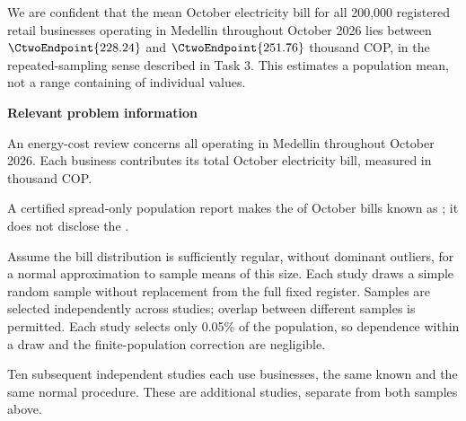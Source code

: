 We are  confident that the mean October electricity bill for all 200,000 registered retail businesses operating in Medellin throughout October 2026 lies between $\CtwoEndpoint{228.24}$ and $\CtwoEndpoint{251.76}$ thousand COP, in the repeated-sampling sense described in Task 3. This estimates a population mean, not a range containing  of individual values.

\secInicio[][sec:p1]

\clearpage



\textbf{Relevant problem information}

\begin{probleminfoexcerpt}
An energy-cost review concerns all     operating in Medellin throughout October 2026. Each business contributes its total October electricity bill, measured in thousand COP.
\end{probleminfoexcerpt}

\begin{probleminfoexcerpt}
A certified spread-only population report makes the    of October bills known as   ; it does not disclose the  .
\end{probleminfoexcerpt}

\begin{probleminfoexcerpt}
Assume the bill distribution is sufficiently regular, without dominant outliers, for a normal approximation to sample means of this size. Each study draws a simple random sample without replacement from the full fixed register. Samples are selected independently across studies; overlap between different samples is permitted. Each study selects only 0.05\% of the population, so dependence within a draw and the finite-population correction are negligible.
\end{probleminfoexcerpt}

\begin{probleminfoexcerpt}
Ten subsequent independent studies each use  businesses, the same known    and the same  normal  procedure. These are additional studies, separate from both samples above.
\end{probleminfoexcerpt}

